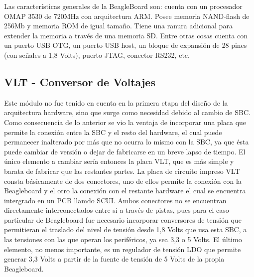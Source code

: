 Las características generales de la BeagleBoard son: cuenta con un procesador OMAP 3530 de 720MHz con arquitectura ARM. Posee  memoria NAND-flash de 256Mb y memoria ROM de igual tamaño. Tiene una ranura adicional para extender la memoria a través de una memoria SD. Entre otras cosas cuenta con un puerto USB OTG, un puerto USB host, un bloque de expansión de 28 pines (con señales a 1,8 Volts), puerto JTAG, conector RS232, etc.


\subsection{VLT - Conversor de Voltajes}
Este módulo no fue tenido en cuenta en la primera etapa del diseño de la arquitectura hardware, sino que surge como necesidad debido al cambio de SBC. Como consecuencia de lo anterior se vio la ventaja de incorporar una placa que permite la conexión entre la SBC y el resto del hardware, el cual puede permanecer inalterado por más que no ocurra lo mismo con la SBC, ya que ésta puede cambiar de versión o dejar de fabricarse en un breve lapso de tiempo. El único elemento a cambiar sería entonces la placa VLT, que es más simple y barata de fabricar que las restantes partes.
La placa de circuito impreso VLT consta básicamente de dos conectores, uno de ellos permite la conexión con la Beagleboard y el otro la conexión con el restante hardware el cual se encuentra intergrado en un PCB llamdo SCUI. Ambos conectores no se encuentran directamente interconectados entre sí a través de pistas, pues para el caso particular de Beagleboard fue necesario incorporar conversores de tensión que permitieran el traslado del nivel de tensión desde 1,8 Volts que usa esta SBC, a las tensiones con las que operan los periféricos, ya sea 3,3 o 5 Volts.
El último elemento, no menos importante, es un regulador de tensión LDO que permite generar 3,3 Volts a partir de la fuente de tensión de 5 Volts de la propia Beagleboard.

